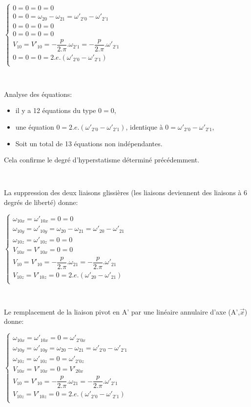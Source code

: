 $\left\{\begin{array}{l}
0=0=0=0 \\ 
0=0=\omega_{20}-\omega_{21}=\omega'_{2'0}-\omega'_{2'1} \\
0=0=0=0 \\
0=0=0=0 \\
V_{10}=V'_{10}=-\dfrac{p}{2.\pi}.\omega_{2'1}=-\dfrac{p}{2.\pi}.\omega'_{2'1} \\
0=0=0=2.e.(\omega'_{2'0}-\omega'_{2'1})\\
\end{array}\right.$

~\

Analyse des équations:
\begin{itemize}
 \item il y a 12 équations du type $0=0$,
 \item une équation $0=2.e.(\omega'_{2'0}-\omega'_{2'1})$, identique à $0=\omega'_{2'0}-\omega'_{2'1}$,
 \item Soit un total de 13 équations non indépendantes.
\end{itemize}

Cela confirme le degré d'hyperstatisme déterminé précédemment.

~\

La suppression des deux liaisons glissières (les liaisons deviennent des liaisons à 6 degrés de liberté) donne:

$\left\{\begin{array}{l}
\omega_{10x}=\omega'_{10x}=0=0 \\ 
\omega_{10y}=\omega'_{10y}=\omega_{20}-\omega_{21}=\omega'_{20}-\omega'_{21} \\
\omega_{10z}=\omega'_{10z}=0=0 \\
V_{10x}=V'_{10x}=0=0 \\
V_{10}=V'_{10}=-\dfrac{p}{2.\pi}.\omega_{21}=-\dfrac{p}{2.\pi}.\omega'_{21} \\
V_{10z}=V'_{10z}=0=2.e.(\omega'_{20}-\omega'_{21})\\
\end{array}\right.$

~\

Le remplacement de la liaison pivot en A' par une linéaire annulaire d'axe (A',$\overrightarrow{x}$) donne:

$\left\{\begin{array}{l}
\omega_{10x}=\omega'_{10x}=0=\omega'_{2'0x} \\ 
\omega_{10y}=\omega'_{10y}=\omega_{20}-\omega_{21}=\omega'_{2'0}-\omega'_{2'1} \\
\omega_{10z}=\omega'_{10z}=0=\omega'_{2'0z} \\
V_{10x}=V'_{10x}=0=V'_{20x} \\
V_{10}=V'_{10}=-\dfrac{p}{2.\pi}.\omega_{21}=-\dfrac{p}{2.\pi}.\omega'_{2'1} \\
V_{10z}=V'_{10z}=0=2.e.(\omega'_{2'0}-\omega'_{2'1})\\
\end{array}\right.$

